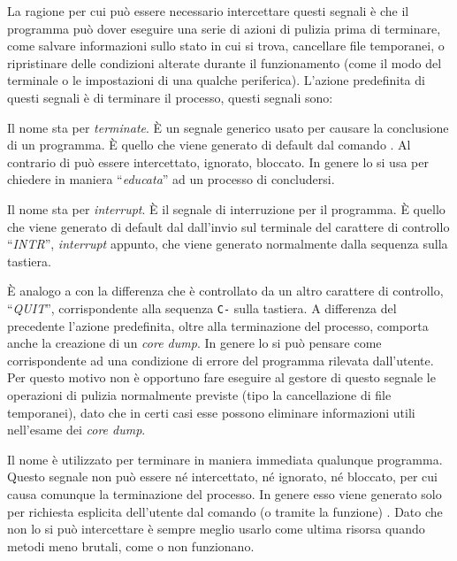 La ragione per cui può essere necessario intercettare questi segnali è che il
programma può dover eseguire una serie di azioni di pulizia prima di
terminare, come salvare informazioni sullo stato in cui si trova, cancellare
file temporanei, o ripristinare delle condizioni alterate durante il
funzionamento (come il modo del terminale o le impostazioni di una qualche
periferica). L'azione predefinita di questi segnali è di terminare il
processo, questi segnali sono:
\begin{basedescript}{\desclabelwidth{2.0cm}}
\item[\signald{SIGTERM}] Il nome sta per \textit{terminate}. È un segnale
  generico usato per causare la conclusione di un programma. È quello che
  viene generato di default dal comando .  Al contrario di
   può essere intercettato, ignorato, bloccato. In genere lo
  si usa per chiedere in maniera ``\textsl{educata}'' ad un processo di
  concludersi.

\item[\signald{SIGINT}] Il nome sta per \textit{interrupt}. È il segnale di
  interruzione per il programma. È quello che viene generato di default dal
  dall'invio sul terminale del carattere di controllo ``\textit{INTR}'',
  \textit{interrupt} appunto, che viene generato normalmente dalla sequenza
   sulla tastiera.

\item[\signald{SIGQUIT}] È analogo a  con la differenza che è
  controllato da un altro carattere di controllo, ``\textit{QUIT}'',
  corrispondente alla sequenza \texttt{C-\bslash} sulla tastiera. A differenza
  del precedente l'azione predefinita, oltre alla terminazione del processo,
  comporta anche la creazione di un \textit{core dump}.  In genere lo si può
  pensare come corrispondente ad una condizione di errore del programma
  rilevata dall'utente. Per questo motivo non è opportuno fare eseguire al
  gestore di questo segnale le operazioni di pulizia normalmente previste
  (tipo la cancellazione di file temporanei), dato che in certi casi esse
  possono eliminare informazioni utili nell'esame dei \textit{core dump}.

\item[\signald{SIGKILL}] Il nome è utilizzato per terminare in maniera immediata
  qualunque programma. Questo segnale non può essere né intercettato, né
  ignorato, né bloccato, per cui causa comunque la terminazione del processo.
  In genere esso viene generato solo per richiesta esplicita dell'utente dal
  comando (o tramite la funzione) . Dato che non lo si può
  intercettare è sempre meglio usarlo come ultima risorsa quando metodi meno
  brutali, come  o  non funzionano. 


\end{basedescript}
